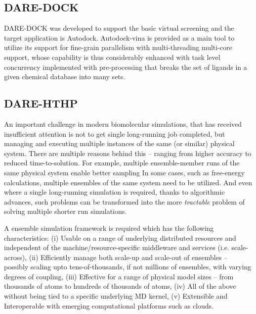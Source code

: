 \documentclass{sig-alternate}
\begin{document}
\subsection{DARE-DOCK}
DARE-DOCK was developed to support the basic virtual screening and the target application is Autodock\cite{autodock}.  Autodock-vina is provided as a main tool to utilize its support for fine-grain parallelism with multi-threading multi-core support, whose capability is thus considerably enhanced with task level concurrency implemented with pre-processing that breaks the set of ligands in a given chemical database into many sets\cite{autodock-vina}.  

%

\subsection{DARE-HTHP}

An important challenge in modern biomolecular simulations, that has
received insufficient attention is not to get single long-running job
completed, but managing and executing multiple instances of the same
(or similar) physical system.  There are multiple reasons behind this
-- ranging from higher accuracy to reduced time-to-solution. For
example, multiple ensemble-member runs of the same physical system
enable better sampling In some cases, such as free-energy
calculations, multiple ensembles of the same system need to be
utilized. And even where a single long-running simulation is required,
thanks to algorithmic advances, such problems can be transformed into
the more {\it tractable} problem of solving multiple shorter run
simulations.



A ensemble simulation framework is required which has the following
characteristics: (i) Usable on a range of underlying distributed
resources and independent of the machine/resource-specific middleware
and services (i.e. scale-across), (ii) Efficiently manage both
scale-up and scale-out of ensembles -- possibly scaling upto
tens-of-thousands, if not millions of ensembles, with varying degrees
of coupling, (iii) Effective for a range of physical model sizes --
from thousands of atoms to hundreds of thousands of atoms, (iv) All of
the above without being tied to a specific underlying MD kernel, (v)
Extensible and Interoperable with emerging computational platforms such
as clouds.
\end{document}
